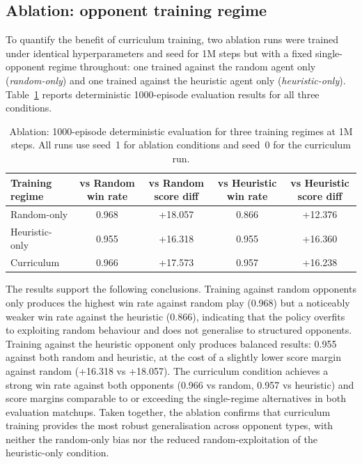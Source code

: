 \documentclass[10pt]{article}
\begin{document}
\subsection{Ablation: opponent training regime}
\label{sec:ablation}

To quantify the benefit of curriculum training, two ablation runs were trained under identical hyperparameters and seed for 1M steps but with a fixed single-opponent regime throughout: one trained against the random agent only (\textit{random-only}) and one trained against the heuristic agent only (\textit{heuristic-only}). Table~\ref{tab:ablation} reports deterministic 1000-episode evaluation results for all three conditions.

\begin{table}[H]
\centering
\begin{tabularx}{\textwidth}{@{}lcccc@{}}
\toprule
Training regime & vs Random win rate & vs Random score diff & vs Heuristic win rate & vs Heuristic score diff \\
\midrule
Random-only     & 0.968 & +18.057 & 0.866 & +12.376 \\
Heuristic-only  & 0.955 & +16.318 & 0.955 & +16.360 \\
Curriculum      & 0.966                     & +17.573                   & 0.957                     & +16.238                  \\
\bottomrule
\end{tabularx}
\caption{Ablation: 1000-episode deterministic evaluation for three training regimes at 1M steps. All runs use seed~1 for ablation conditions and seed~0 for the curriculum run.}
\label{tab:ablation}
\end{table}

The results support the following conclusions. Training against random opponents only produces the highest win rate against random play (0.968) but a noticeably weaker win rate against the heuristic (0.866), indicating that the policy overfits to exploiting random behaviour and does not generalise to structured opponents. Training against the heuristic opponent only produces balanced results: 0.955 against both random and heuristic, at the cost of a slightly lower score margin against random (+16.318 vs +18.057). The curriculum condition achieves a strong win rate against both opponents (0.966 vs random, 0.957 vs heuristic) and score margins comparable to or exceeding the single-regime alternatives in both evaluation matchups. Taken together, the ablation confirms that curriculum training provides the most robust generalisation across opponent types, with neither the random-only bias nor the reduced random-exploitation of the heuristic-only condition.
\end{document}
